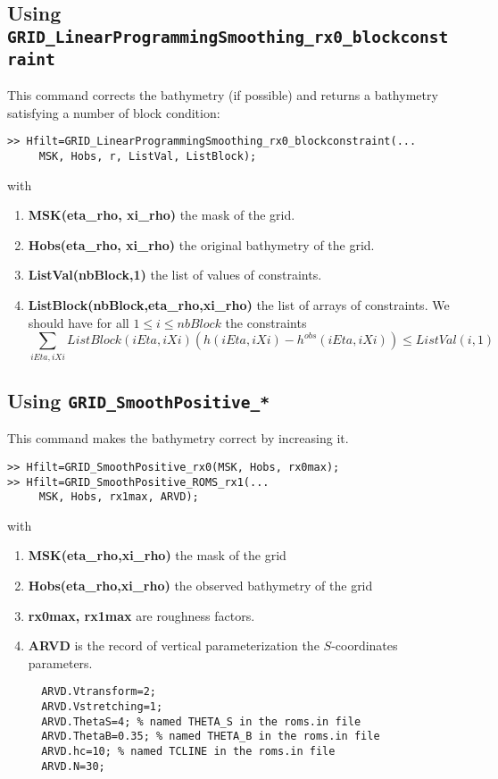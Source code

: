 \documentclass[12pt]{article}
\begin{document}
\subsection{Using {\tt GRID\_LinearProgrammingSmoothing\_rx0\_blockconstraint}}

This command corrects the bathymetry (if possible) and returns a bathymetry satisfying a number of block condition:
\begin{verbatim}
>> Hfilt=GRID_LinearProgrammingSmoothing_rx0_blockconstraint(...
     MSK, Hobs, r, ListVal, ListBlock);
\end{verbatim}
with
\begin{enumerate}
\item {\bf MSK(eta\_rho, xi\_rho)} the mask of the grid.
\item {\bf Hobs(eta\_rho, xi\_rho)} the original bathymetry of the grid.
\item {\bf ListVal(nbBlock,1)} the list of values of constraints.
\item {\bf ListBlock(nbBlock,eta\_rho,xi\_rho)} the list of arrays of constraints. We should have for all $1\leq i\leq nbBlock$ the constraints
\begin{equation*}
\sum_{iEta, iXi} ListBlock(iEta, iXi) (h(iEta, iXi)- h^{obs}(iEta, iXi)) \leq ListVal(i,1)
\end{equation*}


\end{enumerate}


\subsection{Using {\tt GRID\_SmoothPositive\_*}}
This command makes the bathymetry correct by increasing it.
\begin{verbatim}
>> Hfilt=GRID_SmoothPositive_rx0(MSK, Hobs, rx0max);
>> Hfilt=GRID_SmoothPositive_ROMS_rx1(...
     MSK, Hobs, rx1max, ARVD);
\end{verbatim}
with
\begin{enumerate}
\item {\bf MSK(eta\_rho,xi\_rho)} the mask of the grid
\item {\bf Hobs(eta\_rho,xi\_rho)} the observed bathymetry of the grid
\item {\bf rx0max, rx1max} are roughness factors.
\item {\bf ARVD} is the record of vertical parameterization the $S$-coordinates parameters.
\begin{verbatim}
  ARVD.Vtransform=2;
  ARVD.Vstretching=1;
  ARVD.ThetaS=4; % named THETA_S in the roms.in file
  ARVD.ThetaB=0.35; % named THETA_B in the roms.in file
  ARVD.hc=10; % named TCLINE in the roms.in file
  ARVD.N=30;
\end{verbatim}



\end{enumerate}
\end{document}
